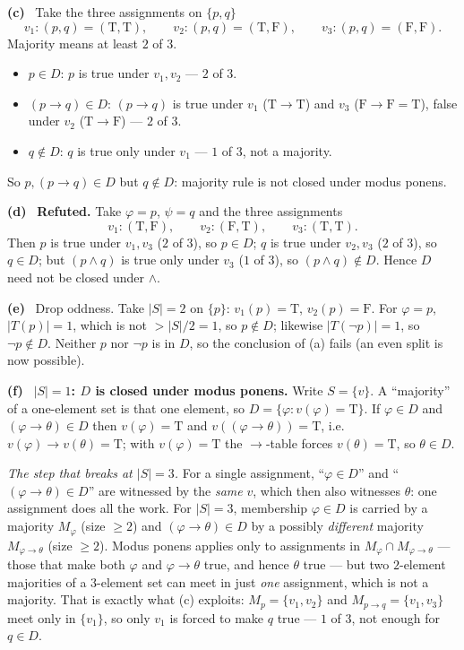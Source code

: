 \documentclass[11pt]{article}
\newcommand{\T}{\mathrm{T}}
\newcommand{\F}{\mathrm{F}}
\newcommand{\solpart}[1]{\smallskip\noindent\textbf{(#1)}\ }
\begin{document}
\solpart{c} Take the three assignments on $\{p,q\}$
\[
v_1:(p,q)=(\T,\T),\qquad v_2:(p,q)=(\T,\F),\qquad v_3:(p,q)=(\F,\F).
\]
Majority means at least $2$ of $3$.
\begin{itemize}[nosep]
\item $p\in D$: $p$ is true under $v_1,v_2$ --- $2$ of $3$. \checkmark
\item $(p\to q)\in D$: $(p\to q)$ is true under $v_1$ ($\T\to\T$) and $v_3$
($\F\to\F=\T$), false under $v_2$ ($\T\to\F$) --- $2$ of $3$. \checkmark
\item $q\notin D$: $q$ is true only under $v_1$ --- $1$ of $3$, not a majority.
\checkmark
\end{itemize}
So $p,(p\to q)\in D$ but $q\notin D$: majority rule is not closed under modus ponens.

\solpart{d} \textbf{Refuted.} Take $\varphi=p$, $\psi=q$ and the three assignments
\[
v_1:(\T,\F),\qquad v_2:(\F,\T),\qquad v_3:(\T,\T).
\]
Then $p$ is true under $v_1,v_3$ ($2$ of $3$), so $p\in D$; $q$ is true under
$v_2,v_3$ ($2$ of $3$), so $q\in D$; but $(p\land q)$ is true only under $v_3$
($1$ of $3$), so $(p\land q)\notin D$. Hence $D$ need not be closed under $\land$.

\solpart{e} Drop oddness. Take $|S|=2$ on $\{p\}$: $v_1(p)=\T$, $v_2(p)=\F$. For
$\varphi=p$, $|T(p)|=1$, which is not $>|S|/2=1$, so $p\notin D$; likewise
$|T(\lnot p)|=1$, so $\lnot p\notin D$. Neither $p$ nor $\lnot p$ is in $D$, so the
conclusion of (a) fails (an even split is now possible).

\solpart{f} \textbf{$|S|=1$: $D$ is closed under modus ponens.} Write $S=\{v\}$. A
``majority'' of a one-element set is that one element, so $D=\{\varphi:v(\varphi)=
\T\}$. If $\varphi\in D$ and $(\varphi\to\theta)\in D$ then $v(\varphi)=\T$ and
$v((\varphi\to\theta))=\T$, i.e.\ $v(\varphi)\to v(\theta)=\T$; with $v(\varphi)=\T$
the $\to$-table forces $v(\theta)=\T$, so $\theta\in D$.

\emph{The step that breaks at $|S|=3$.} For a single assignment, ``$\varphi\in D$''
and ``$(\varphi\to\theta)\in D$'' are witnessed by the \emph{same} $v$, which then
also witnesses $\theta$: one assignment does all the work. For $|S|=3$, membership
$\varphi\in D$ is carried by a majority $M_\varphi$ (size $\ge 2$) and
$(\varphi\to\theta)\in D$ by a possibly \emph{different} majority
$M_{\varphi\to\theta}$ (size $\ge 2$). Modus ponens applies only to assignments in
$M_\varphi\cap M_{\varphi\to\theta}$ --- those that make both $\varphi$ and
$\varphi\to\theta$ true, and hence $\theta$ true --- but two $2$-element majorities
of a $3$-element set can meet in just \emph{one} assignment, which is not a
majority. That is exactly what (c) exploits: $M_p=\{v_1,v_2\}$ and $M_{p\to q}=
\{v_1,v_3\}$ meet only in $\{v_1\}$, so only $v_1$ is forced to make $q$ true ---
$1$ of $3$, not enough for $q\in D$.
\end{document}
